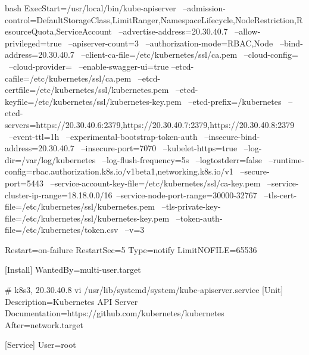 \begin{outline}[enumerate]
\begin{code-in-enumerate}{bash}
ExecStart=/usr/local/bin/kube-apiserver \
    --admission-control=DefaultStorageClass,LimitRanger,NamespaceLifecycle,NodeRestriction,ResourceQuota,ServiceAccount \
    --advertise-address=20.30.40.7 \
    --allow-privileged=true \
    --apiserver-count=3 \
    --authorization-mode=RBAC,Node \
    --bind-address=20.30.40.7 \
    --client-ca-file=/etc/kubernetes/ssl/ca.pem \
    --cloud-config= \
    --cloud-provider= \
    --enable-swagger-ui=true --etcd-cafile=/etc/kubernetes/ssl/ca.pem \
    --etcd-certfile=/etc/kubernetes/ssl/kubernetes.pem \
    --etcd-keyfile=/etc/kubernetes/ssl/kubernetes-key.pem \
    --etcd-prefix=/kubernetes \
    --etcd-servers=https://20.30.40.6:2379,https://20.30.40.7:2379,https://20.30.40.8:2379 \
    --event-ttl=1h \
    --experimental-bootstrap-token-auth \
    --insecure-bind-address=20.30.40.7 \
    --insecure-port=7070 \
    --kubelet-https=true \
    --log-dir=/var/log/kubernetes \
    --log-flush-frequency=5s \
    --logtostderr=false \
    --runtime-config=rbac.authorization.k8s.io/v1beta1,networking.k8s.io/v1 \
    --secure-port=5443 \
    --service-account-key-file=/etc/kubernetes/ssl/ca-key.pem \
    --service-cluster-ip-range=18.18.0.0/16\
    --service-node-port-range=30000-32767 \
    --tls-cert-file=/etc/kubernetes/ssl/kubernetes.pem \
    --tls-private-key-file=/etc/kubernetes/ssl/kubernetes-key.pem \
    --token-auth-file=/etc/kubernetes/token.csv \
    --v=3

Restart=on-failure
RestartSec=5
Type=notify
LimitNOFILE=65536

[Install]
WantedBy=multi-user.target

# k8s3, 20.30.40.8
vi /usr/lib/systemd/system/kube-apiserver.service
[Unit]
Description=Kubernetes API Server
Documentation=https://github.com/kubernetes/kubernetes
After=network.target

[Service]
User=root


\end{code-in-enumerate}
\end{outline}

